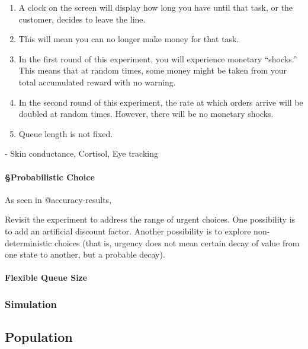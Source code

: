 \documentclass[
]{article}
\let\oldparagraph\paragraph
\renewcommand{\paragraph}[1]{\oldparagraph{#1}\mbox{}}
\begin{document}
\begin{enumerate}
\def\labelenumi{\arabic{enumi}.}
\item
  A clock on the screen will display how long you have until that task,
  or the customer, decides to leave the line.
\item
  This will mean you can no longer make money for that task.
\item
  In the first round of this experiment, you will experience monetary
  ``shocks.'' This means that at random times, some money might be taken
  from your total accumulated reward with no warning.
\item
  In the second round of this experiment, the rate at which orders
  arrive will be doubled at random times. However, there will be no
  monetary shocks.
\item
  Queue length is not fixed.
\end{enumerate}

- Skin conductance, Cortisol, Eye tracking

\hypertarget{probabilistic-choice}{%
\paragraph{§Probabilistic Choice}\label{probabilistic-choice}}

As seen in @accuracy-results,

Revisit the experiment to address the range of urgent choices. One
possibility is to add an artificial discount factor. Another possibility
is to explore non-deterministic choices (that is, urgency does not mean
certain decay of value from one state to another, but a probable decay).

\hypertarget{flexible-queue-size}{%
\paragraph{Flexible Queue Size}\label{flexible-queue-size}}

\hypertarget{simulation-2}{%
\subsubsection{Simulation}\label{simulation-2}}

\hypertarget{population}{%
\subsection{Population}\label{population}}
\end{document}
